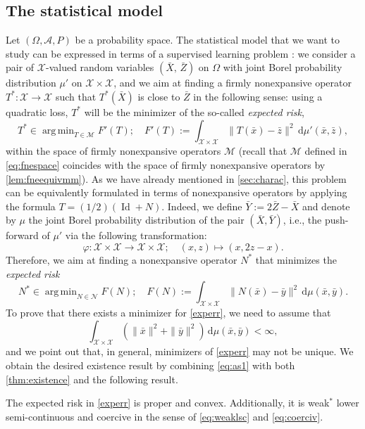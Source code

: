 \documentclass[onefignum,onetabnum]{siamonline250211}
\newcommand{\Id}{\operatorname{Id}}
\newcommand{\N}{\mathcal{N}}
\newcommand{\M}{\mathcal{M}}
\newcommand{\cX}{\mathcal{X}}
\DeclareMathOperator*{\argmin}{arg\,min}
\begin{document}
\subsection{The statistical model}\label{sec:statmodel}
Let $(\Omega, \mathcal{A}, P)$ be a probability space. The statistical model that we want to study can be expressed in terms of a supervised learning problem \cite{cusma}: we consider a pair of $\cX$-valued random variables $(\bar{X}, \, \bar{Z})$ on $\Omega$ with joint Borel probability distribution $\mu'$ on $\cX\times\cX$, and we aim at finding a firmly nonexpansive operator $T^*:\cX\to\cX$ such that $T^*(\bar{X})$ is close to $\bar{Z}$ in the following sense: using a quadratic loss, $T^*$ will be the minimizer of the so-called \emph{expected risk},
\begin{equation}
T^*\in\argmin_{T\in\M} F'(T); \quad F'(T):=\int_{\cX\times\cX}\|T(\bar x)-\bar z\|^2 \, \mathrm{d}\mu'(\bar x, \bar z),
\end{equation}
within the space of firmly nonexpansive operators $\M$ (recall that $\M$ defined in \cref{eq:fnespace} coincides with the space of firmly nonexpansive operators by \cref{lem:fneequivmm}). As we have already mentioned in \cref{sec:charac}, this problem can be equivalently formulated in terms of nonexpansive operators by applying the formula $T=(1/2)(\Id+N)$. Indeed, we define $\bar{Y}:= 2\bar{Z} - \bar{X}$ and denote by $\mu$ the joint Borel probability distribution of the pair $(\bar{X}, \bar{Y})$, i.e., the push-forward of $\mu'$ via the following transformation:
$$
\varphi : \cX\times\cX \to \cX \times \cX;\quad (x,z) \mapsto (x,2z-x).
$$
Therefore, we aim at finding a nonexpansive operator $N^*$ that minimizes the \emph{expected risk}
\begin{equation}\label{experr}
\tag{CP}
N^*\in \argmin_{N\in\N}F(N); \quad F(N):=\int_{\cX\times\cX}\|N(\bar x)-\bar y\|^2 \, \mathrm{d}\mu(\bar x, \bar y).
\end{equation}
To prove that there exists a minimizer for \cref{experr}, we need to assume that
\begin{equation}\label{eq:as1}
\tag{A1}
\int_{\cX\times\cX}\left(\|\bar x\|^2+\|\bar y\|^2\right) \, \mathrm{d}\mu(\bar x, \bar y)< \infty,
\end{equation}
and we point out that, in general, minimizers of \eqref{experr} may not be unique. We obtain the desired existence result by combining \cref{eq:as1} with both \cref{thm:existence} and the following result.
\begin{proposition}\label{prop:experr}
The expected risk in \cref{experr} is proper and convex. Additionally, it is weak$^*$ lower semi-continuous and coercive in the sense of \cref{eq:weaklsc} and \cref{eq:coerciv}.
\end{proposition}
\end{document}

